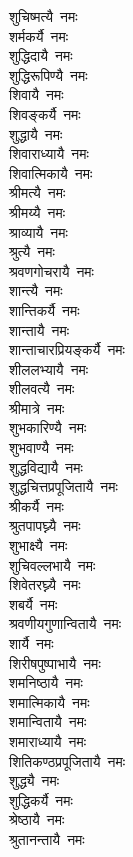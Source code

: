\begin{flushleft}
\begin{multicols}{2}
शुचिष्मत्यै~नमः\hfill{}\\
शर्मकर्यै~नमः\\
शुद्धिदायै~नमः\\
शुद्धिरूपिण्यै~नमः\\
शिवायै~नमः\\
शिवङ्कर्यै~नमः\\
शुद्धायै~नमः\\
शिवाराध्यायै~नमः\\
शिवात्मिकायै~नमः\\
श्रीमत्यै~नमः\\
श्रीमय्यै~नमः\hfill{}\\
श्राव्यायै~नमः\\
श्रुत्यै~नमः\\
श्रवणगोचरायै~नमः\\
शान्त्यै~नमः\\
शान्तिकर्यै~नमः\\
शान्तायै~नमः\\
शान्ताचारप्रियङ्कर्यै~नमः\\
शीललभ्यायै~नमः\\
शीलवत्यै~नमः\\
श्रीमात्रे~नमः\hfill{}\\
शुभकारिण्यै~नमः\\
शुभवाण्यै~नमः\\
शुद्धविद्यायै~नमः\\
शुद्धचित्तप्रपूजितायै~नमः\\
श्रीकर्यै~नमः\\
श्रुतपापघ्न्यै~नमः\\
शुभाक्ष्यै~नमः\\
शुचिवल्लभायै~नमः\\
शिवेतरघ्न्यै~नमः\\
शबर्यै~नमः\hfill{}\\
श्रवणीयगुणान्वितायै~नमः\\
शार्यै~नमः\\
शिरीषपुष्पाभायै~नमः\\
शमनिष्ठायै~नमः\\
शमात्मिकायै~नमः\\
शमान्वितायै~नमः\\
शमाराध्यायै~नमः\\
शितिकण्ठप्रपूजितायै~नमः\\
शुद्ध्यै~नमः\\
शुद्धिकर्यै~नमः\hfill{}\\
श्रेष्ठायै~नमः\\
श्रुतानन्तायै~नमः\\

\end{multicols}
\end{flushleft}
